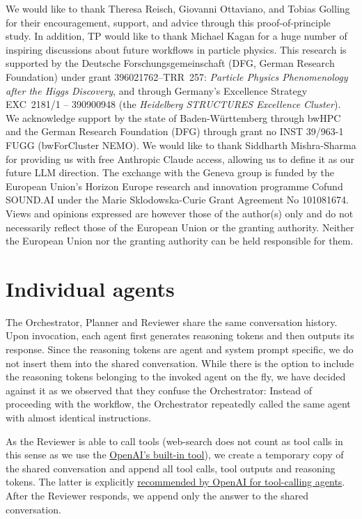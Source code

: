 \documentclass[submission, Phys]{SciPost}
\begin{document}
We would like to thank Theresa Reisch, Giovanni Ottaviano, and Tobias Golling for their encouragement, support, and advice through this proof-of-principle study. In addition, TP would like to thank Michael Kagan for a huge number of inspiring discussions about future workflows in particle physics. This research is supported by the Deutsche Forschungsgemeinschaft (DFG, German Research Foundation) under grant 396021762--TRR~257: \textsl{Particle Physics Phenomenology after the Higgs Discovery}, and through Germany's Excellence Strategy EXC~2181/1 -- 390900948 (the \textsl{Heidelberg STRUCTURES Excellence Cluster}). We acknowledge support by the state of Baden-Württemberg through bwHPC and the German Research Foundation (DFG) through grant no INST 39/963-1 FUGG (bwForCluster NEMO). We would like to thank Siddharth Mishra-Sharma for providing us with free Anthropic Claude access, allowing us to define it as our future LLM direction. The exchange with the Geneva group is funded by the European Union’s Horizon Europe research and innovation programme Cofund SOUND.AI under the Marie Sklodowska-Curie Grant Agreement No 101081674. Views and opinions expressed are however those of the author(s) only and do not necessarily reflect those of the European Union or the granting authority. Neither the European Union nor the granting authority can be held responsible for them.


\clearpage
\appendix
\section{Individual agents} 
\label{app:agentic_details}


The Orchestrator, Planner and Reviewer share the same conversation history. Upon invocation, each agent first generates reasoning tokens and then outputs its response. Since the reasoning tokens are agent and system prompt specific, we do not insert them into the shared conversation. While there is the option to include the reasoning tokens belonging to the invoked agent on the fly, we have decided against it as we observed that they confuse the Orchestrator: Instead of proceeding with the workflow, the Orchestrator repeatedly called the same agent with almost identical instructions.

As the Reviewer is able to call tools (web-search does not count as tool calls in this sense as we use the \href{https://platform.openai.com/docs/guides/tools-web-search}{OpenAI's built-in tool}), we create a temporary copy of the shared conversation and append all tool calls, tool outputs and reasoning tokens. The latter is explicitly \href{https://platform.openai.com/docs/guides/reasoning#keeping-reasoning-items-in-context}{recommended by OpenAI for tool-calling agents}. After the Reviewer responds, we append only the answer to the shared conversation.
\end{document}
